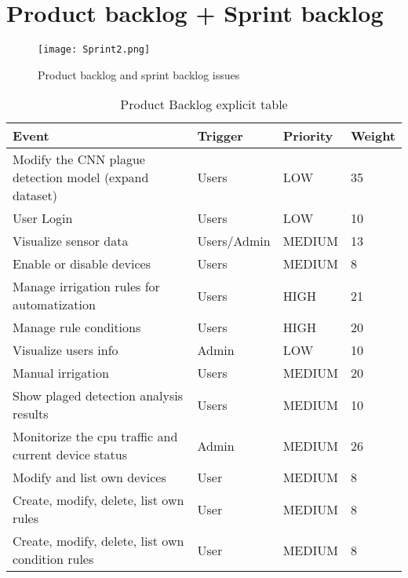 \documentclass[11pt,a4paper]{article}
\begin{document}
\section{Product backlog + Sprint backlog}
\begin{figure}[hbtp]
\centering
\texttt{[image: Sprint2.png]}
\caption{Product backlog and sprint backlog issues}
\end{figure}
\newpage
\begin{table}[htbp]
\begin{tabular}{|l|l|l|l|} 
\hline
Event                                                & Trigger     & Priority & Weight \\ \hline \hline
Modify the CNN plague detection model (expand dataset) & Users       & LOW     & 35  \\ \hline
User Login                                             & Users       & LOW   & 10  \\ \hline              
Visualize sensor data                                & Users/Admin & MEDIUM   & 13     \\ \hline
Enable or disable devices                            & Users       & MEDIUM   & 8      \\ \hline
Manage irrigation rules for automatization           & Users       & HIGH   & 21      \\ \hline
Manage rule conditions                               & Users       & HIGH   & 20     \\ \hline
Visualize users info                                 & Admin       & LOW      & 10     \\ \hline
Manual irrigation                                    & Users       & MEDIUM   & 20     \\ \hline
Show plaged detection analysis results               & Users       & MEDIUM   & 10     \\ \hline
Monitorize the cpu traffic and current device status & Admin       & MEDIUM   & 26     \\ \hline
Modify and list own devices                          & User        & MEDIUM   & 8      \\ \hline
Create, modify, delete, list own rules               & User        & MEDIUM   & 8      \\ \hline
Create, modify, delete, list own condition rules     & User        & MEDIUM   & 8      \\ \hline
\end{tabular}
\caption{Product Backlog explicit table}
\end{table}
\end{document}
